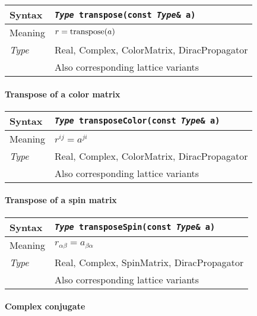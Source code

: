\documentclass[12pt,letterpaper]{article}
\newcommand{\tReal}{Real}
\newcommand{\tComplex}{Complex}
\newcommand{\tColorMatrix}{ColorMatrix}
\newcommand{\tDiracPropagator}{DiracPropagator}
\newcommand{\tSpinMatrix}{SpinMatrix}
\newcommand{\simLatticeVariants}{Also corresponding lattice variants}
\newcommand{\itt}{\it Type}
\newcommand{\protoUnaryQual}[1]{{\tt {\it Type} #1(const {\it Type}\& a)}}
\begin{document}
\begin{flushleft}
  \begin{tabular}{|l|l|}
  \hline
  Syntax      & \protoUnaryQual{\tt transpose}  \\
  \hline
  Meaning     & $r = {\rm transpose}(a)$ \\
  \hline
  \itt        & \tReal, \tComplex, \tColorMatrix, \tDiracPropagator \\
              & \simLatticeVariants \\
  \hline
  \end{tabular}
\end{flushleft}

\paragraph{Transpose of a color matrix}

\begin{flushleft}
  \begin{tabular}{|l|l|}
  \hline
  Syntax      & \protoUnaryQual{\tt transposeColor}  \\
  \hline
  Meaning     & $r^{ij} = a^{ji}$ \\
  \hline
  \itt        & \tReal, \tComplex, \tColorMatrix, \tDiracPropagator \\
              & \simLatticeVariants \\
  \hline
  \end{tabular}
\end{flushleft}

\paragraph{Transpose of a spin matrix}

\begin{flushleft}
  \begin{tabular}{|l|l|}
  \hline
  Syntax      & \protoUnaryQual{\tt transposeSpin}  \\
  \hline
  Meaning     & $r_{\alpha\beta} = a_{\beta\alpha}$ \\
  \hline
  \itt        & \tReal, \tComplex, \tSpinMatrix, \tDiracPropagator \\
              & \simLatticeVariants \\
  \hline
  \end{tabular}
\end{flushleft}

\paragraph{Complex conjugate}
\end{document}

